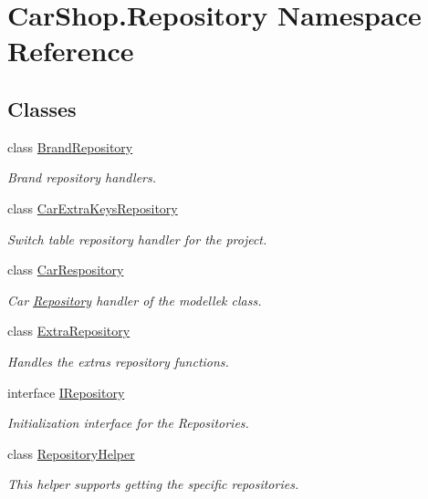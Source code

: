 \hypertarget{namespace_car_shop_1_1_repository}{}\section{Car\+Shop.\+Repository Namespace Reference}
\label{namespace_car_shop_1_1_repository}
\subsection*{Classes}
\begin{DoxyCompactItemize}
\item 
class \mbox{\hyperlink{class_car_shop_1_1_repository_1_1_brand_repository}{Brand\+Repository}}
\begin{DoxyCompactList}\small\item\em Brand repository handlers. \end{DoxyCompactList}\item 
class \mbox{\hyperlink{class_car_shop_1_1_repository_1_1_car_extra_keys_repository}{Car\+Extra\+Keys\+Repository}}
\begin{DoxyCompactList}\small\item\em Switch table repository handler for the project. \end{DoxyCompactList}\item 
class \mbox{\hyperlink{class_car_shop_1_1_repository_1_1_car_respository}{Car\+Respository}}
\begin{DoxyCompactList}\small\item\em Car \mbox{\hyperlink{namespace_car_shop_1_1_repository}{Repository}} handler of the modellek class. \end{DoxyCompactList}\item 
class \mbox{\hyperlink{class_car_shop_1_1_repository_1_1_extra_repository}{Extra\+Repository}}
\begin{DoxyCompactList}\small\item\em Handles the extra\textquotesingle{}s repository functions. \end{DoxyCompactList}\item 
interface \mbox{\hyperlink{interface_car_shop_1_1_repository_1_1_i_repository}{I\+Repository}}
\begin{DoxyCompactList}\small\item\em Initialization interface for the Repositories. \end{DoxyCompactList}\item 
class \mbox{\hyperlink{class_car_shop_1_1_repository_1_1_repository_helper}{Repository\+Helper}}
\begin{DoxyCompactList}\small\item\em This helper supports getting the specific repositories. \end{DoxyCompactList}\end{DoxyCompactItemize}
